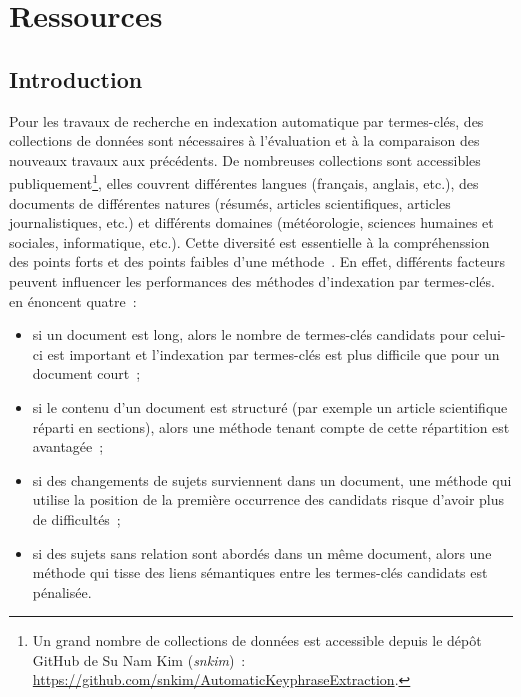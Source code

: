 \chapter{Ressources}
\label{chap:main-data_description}

  \section{Introduction}
  \label{sec:main-data_description-introduction}
    Pour les travaux de recherche en indexation automatique par termes-clés, des
    collections de données sont nécessaires à l'évaluation et à la comparaison
    des nouveaux travaux aux précédents. De nombreuses collections sont
    accessibles publiquement\footnote{Un grand nombre de collections de données
    est accessible depuis le dépôt GitHub de Su Nam Kim (\textit{snkim})~:
    \url{https://github.com/snkim/AutomaticKeyphraseExtraction}.}, elles
    couvrent différentes langues (français, anglais, etc.), des documents de
    différentes natures (résumés, articles scientifiques, articles
    journalistiques, etc.) et différents domaines (météorologie, sciences
    humaines et sociales, informatique, etc.). Cette diversité est essentielle à
    la compréhenssion des points forts et des points faibles d'une
    méthode~\cite{hassan2010conundrums}. En effet, différents facteurs peuvent
    influencer les performances des méthodes d'indexation par termes-clés.
     en énoncent quatre~:
    \begin{itemize}
      \item{si un document est long, alors le nombre de termes-clés candidats
            pour celui-ci est important et l'indexation par termes-clés est plus
            difficile que pour un document court~;}
      \item{si le contenu d'un document est structuré (par exemple un article
            scientifique réparti en sections), alors une méthode tenant compte
            de cette répartition est avantagée~;}
      \item{si des changements de sujets surviennent dans un document, une
            méthode qui utilise la position de la première occurrence des
            candidats risque d'avoir plus de difficultés~;}
      \item{si des sujets sans relation sont abordés dans un même document,
            alors une méthode qui tisse des liens sémantiques entre les
            termes-clés candidats est pénalisée.}
    \end{itemize}

